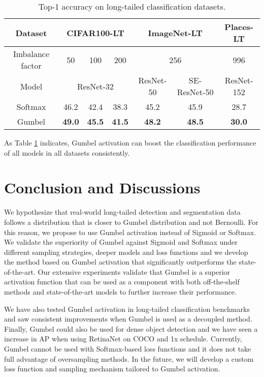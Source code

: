 \documentclass[runningheads]{llncs}
\begin{document}
\begin{table}
    \centering
    \caption{Top-1 accuracy on long-tailed classification datasets.}
    \begin{tabular}{c|ccc|cc|c}
         Dataset&\multicolumn{3}{c|}{CIFAR100-LT}&\multicolumn{2}{c|}{ImageNet-LT}&Places-LT\\
         \hline
         Imbalance factor&50&100&200&\multicolumn{2}{c|}{256}&996\\
         Model&\multicolumn{3}{c|}{ResNet-32}&ResNet-50&SE-ResNet-50&ResNet-152\\
         
         \hline
         Softmax &46.2&42.4&38.3&45.2&45.9&28.7\\
         Gumbel &\textbf{49.0}&\textbf{45.5}&\textbf{41.5}&\textbf{48.2}&\textbf{48.5}&\textbf{30.0}\\
    \end{tabular}
    \label{tab:classif_res}
    \vspace{-4mm}
\end{table}

As Table \ref{tab:classif_res} indicates, Gumbel activation can boost the classification performance of all models in all datasets consistently.








\section{Conclusion and Discussions}
\label{conclusion}
 We hypothesize that real-world long-tailed detection and segmentation data follows a distribution that is closer to Gumbel distribution and not Bernoulli. For this reason, we propose to use Gumbel activation instead of Sigmoid or Softmax. We validate the superiority of Gumbel against Sigmoid and Softmax under different sampling strategies, deeper models and loss functions and we develop the  method based on Gumbel activation that significantly outperforms the state-of-the-art. Our extensive experiments validate that Gumbel is a superior activation function that can be used as a component with both off-the-shelf methods and state-of-the-art models to further increase their performance.
 
 We have also tested Gumbel activation in long-tailed classification benchmarks and saw consistent improvements when Gumbel is used as a decoupled method. Finally, Gumbel could also be used for dense object detection and we have seen a  increase in AP when using RetinaNet on COCO and 1x schedule.
 Currently, Gumbel cannot be used with Softmax-based loss functions and it does not take full advantage of oversampling methods. In the future, we will develop a custom loss function and sampling mechanism tailored to Gumbel activation. 
 
\end{document}
